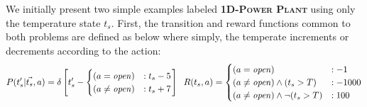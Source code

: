 \documentclass{article} %
\newcommand{\open}{\mathit{open}}
\begin{document}
We initially present two 
simple examples labeled \textsc{\bf 1D-Power Plant} 
using only the temperature state $t_s$.
First, the transition and reward functions common to both problems
are defined as below where simply, the temperate increments or
decrements according to the action:
{\footnotesize
\vspace{-1mm}
\begin{align}
P(t_s'|\vec{t_s},a)= \delta\left[ t_s' - 
\begin{cases}
 (a=\open) &: t_s - 5 \\ 
(a \neq \open) &: t_s + 7 \\
\end{cases}
\right]
\hspace{2mm}
R(t_s,a) = 
\begin{cases}
 (a=\open) &: -1 \\
(a \neq \open)\wedge (t_s>T) &: -1000 \\
(a \neq \open)\wedge \neg(t_s>T) &: 100 \\
\end{cases}
\end{align}
\vspace{-4mm}
}
\end{document}
